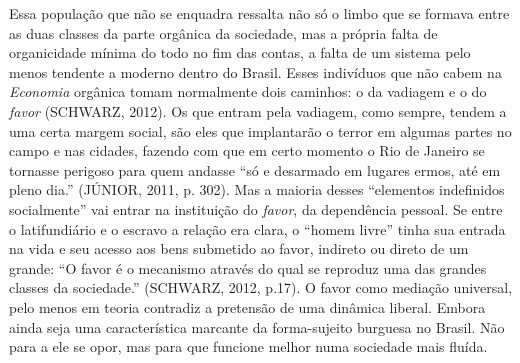 Essa população que não se enquadra ressalta não só o limbo que se
formava entre as duas classes da parte orgânica da sociedade, mas a
própria falta de organicidade mínima do todo no fim das contas, a falta
de um sistema pelo menos tendente a moderno dentro do Brasil. Esses
indivíduos que não cabem na \emph{Economia} orgânica tomam normalmente
dois caminhos: o da vadiagem e o do \emph{favor} (SCHWARZ, 2012). Os que
entram pela vadiagem, como sempre, tendem a uma certa margem social, são
eles que implantarão o terror em algumas partes no campo e nas cidades,
fazendo com que em certo momento o Rio de Janeiro se tornasse perigoso
para quem andasse ``só e desarmado em lugares ermos, até em pleno dia.''
(JÚNIOR, 2011, p. 302). Mas a maioria desses ``elementos indefinidos
socialmente'' vai entrar na instituição do \emph{favor}, da dependência
pessoal. Se entre o latifundiário e o escravo a relação era clara, o
``homem livre'' tinha sua entrada na vida e seu acesso aos bens
submetido ao favor, indireto ou direto de um grande: ``O favor é o
mecanismo através do qual se reproduz uma das grandes classes da
sociedade.'' (SCHWARZ, 2012, p.17). O favor como mediação universal,
pelo menos em teoria contradiz a pretensão de uma dinâmica liberal.
Embora ainda seja uma característica marcante da forma-sujeito burguesa
no Brasil. Não para a ele se opor, mas para que funcione melhor numa
sociedade mais fluída.

